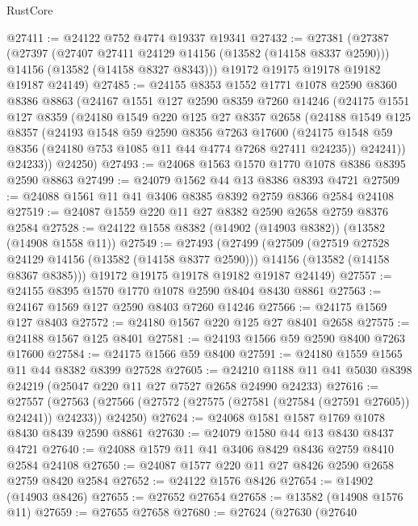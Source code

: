 \begin{lexlean}{RustCore}
\begin{coremodule}
@27411 := @24122 @752 @4774 @19337 @19341
@27432 := @27381
    (@27387
      (@27397
        (@27407 @27411 @24129 @14156 (@13582 (@14158 @8337 @2590)))
        @14156
        (@13582 (@14158 @8327 @8343)))
      @19172
      @19175
      @19178
      @19182
      @19187
      @24149)
@27485 := @24155
    @8353
    @1552
    @1771
    @1078
    @2590
    @8360
    @8386
    @8863
    (@24167
      @1551
      @127
      @2590
      @8359
      @7260
      @14246
      (@24175
        @1551
        @127
        @8359
        (@24180
          @1549
          @220
          @125
          @27
          @8357
          @2658
          (@24188
            @1549
            @125
            @8357
            (@24193
              @1548
              @59
              @2590
              @8356
              @7263
              @17600
              (@24175 @1548 @59 @8356 (@24180 @753 @1085 @11 @44 @4774 @7268 @27411 @24235))
              @24241))
          @24233))
      @24250)
@27493 := @24068 @1563 @1570 @1770 @1078 @8386 @8395 @2590 @8863
@27499 := @24079 @1562 @44 @13 @8386 @8393 @4721
@27509 := @24088 @1561 @11 @41 @3406 @8385 @8392 @2759 @8366 @2584 @24108
@27519 := @24087 @1559 @220 @11 @27 @8382 @2590 @2658 @2759 @8376 @2584
@27528 := @24122 @1558 @8382 (@14902 (@14903 @8382)) (@13582 (@14908 @1558 @11))
@27549 := @27493
    (@27499
      (@27509
        (@27519 @27528 @24129 @14156 (@13582 (@14158 @8377 @2590)))
        @14156
        (@13582 (@14158 @8367 @8385)))
      @19172
      @19175
      @19178
      @19182
      @19187
      @24149)
@27557 := @24155 @8395 @1570 @1770 @1078 @2590 @8404 @8430 @8861
@27563 := @24167 @1569 @127 @2590 @8403 @7260 @14246
@27566 := @24175 @1569 @127 @8403
@27572 := @24180 @1567 @220 @125 @27 @8401 @2658
@27575 := @24188 @1567 @125 @8401
@27581 := @24193 @1566 @59 @2590 @8400 @7263 @17600
@27584 := @24175 @1566 @59 @8400
@27591 := @24180 @1559 @1565 @11 @44 @8382 @8399 @27528
@27605 := @24210 @1188 @11 @41 @5030 @8398 @24219 (@25047 @220 @11 @27 @7527 @2658 @24990 @24233)
@27616 := @27557
    (@27563 (@27566 (@27572 (@27575 (@27581 (@27584 (@27591 @27605)) @24241)) @24233)) @24250)
@27624 := @24068 @1581 @1587 @1769 @1078 @8430 @8439 @2590 @8861
@27630 := @24079 @1580 @44 @13 @8430 @8437 @4721
@27640 := @24088 @1579 @11 @41 @3406 @8429 @8436 @2759 @8410 @2584 @24108
@27650 := @24087 @1577 @220 @11 @27 @8426 @2590 @2658 @2759 @8420 @2584
@27652 := @24122 @1576 @8426
@27654 := @14902 (@14903 @8426)
@27655 := @27652 @27654
@27658 := @13582 (@14908 @1576 @11)
@27659 := @27655 @27658
@27680 := @27624
    (@27630
      (@27640

\end{coremodule}
\end{lexlean}
